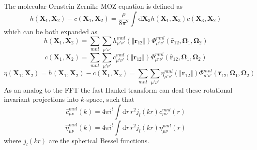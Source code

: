 The molecular Ornstein-Zernike \acs{MOZ} equation is defined as
\begin{equation}
h(\mathbf{X}_{1},\mathbf{X}_{2})-c(\mathbf{X}_{1},\mathbf{X}_{2})=\frac{\rho}{8\pi^{2}}\int\mathrm{d}\mathbf{X}_{3}h(\mathbf{X}_{1},\mathbf{X}_{3})c(\mathbf{X}_{3},\mathbf{X}_{2})
\end{equation}
which can be both expanded as
\begin{equation}
h(\mathbf{X}_{1},\mathbf{X}_{2})=\sum_{mnl}\sum_{\mu'\nu'}h_{\mu'\nu'}^{mnl}(\left\Vert \mathbf{r}_{12}\right\Vert )\Phi_{\mu'\nu'}^{mnl}(\hat{\mathbf{r}}_{12},\mathbf{\Omega}_{1},\mathbf{\Omega}_{2})
\end{equation}
\begin{equation}
c(\mathbf{X}_{1},\mathbf{X}_{2})=\sum_{mnl}\sum_{\mu'\nu'}c_{\mu'\nu'}^{mnl}(\left\Vert \mathbf{r}_{12}\right\Vert )\Phi_{\mu'\nu'}^{mnl}(\hat{\mathbf{r}}_{12},\mathbf{\Omega}_{1},\mathbf{\Omega}_{2})
\end{equation}
\begin{equation}
\eta(\mathbf{X}_{1},\mathbf{X}_{2})=h(\mathbf{X}_{1},\mathbf{X}_{2})-c(\mathbf{X}_{1},\mathbf{X}_{2})=\sum_{mnl}\sum_{\mu'\nu'}\eta_{\mu'\nu'}^{mnl}(\left\Vert \mathbf{r}_{12}\right\Vert )\Phi_{\mu'\nu'}^{mnl}(\hat{\mathbf{r}}_{12},\mathbf{\Omega}_{1},\mathbf{\Omega}_{2})
\end{equation}
As an analog to the \acs{FFT} the fast Hankel transform can deal
these rotational invariant projections into $k$-space, such that
\begin{equation}
\hat{c}_{\mu\nu}^{mnl}(k)=4\pi i^{l}\int\mathrm{d}r\,r^{2}j_{l}(kr)c_{\mu\nu}^{mnl}(r)
\end{equation}
\begin{equation}
\hat{\eta}_{\mu\nu}^{mnl}(k)=4\pi i^{l}\int\mathrm{d}r\,r^{2}j_{l}(kr)\eta_{\mu\nu}^{mnl}(r)
\end{equation}
where $j_{l}(kr)$ are the spherical Bessel functions.

